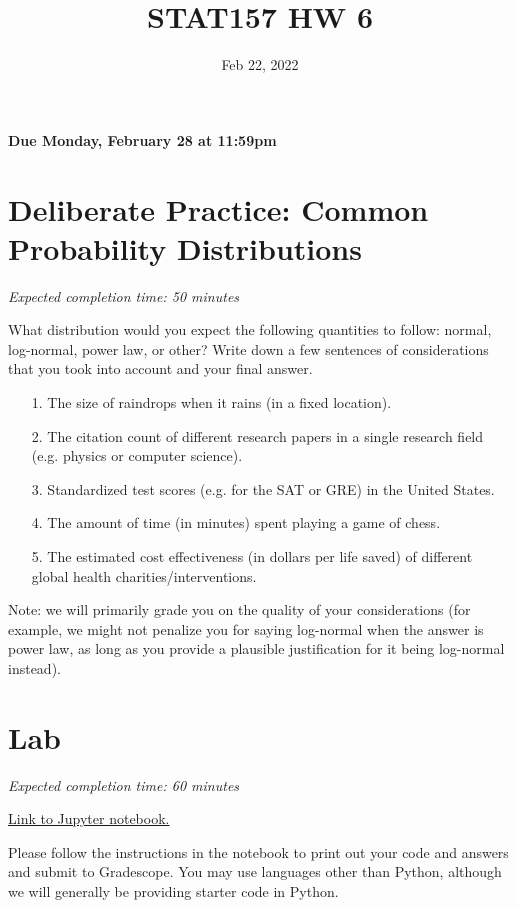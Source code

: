 \documentclass[11pt]{article}
\title{STAT157 HW 6}
\date{Feb 22, 2022}
\begin{document}
\maketitle

\hfill \textbf{Due Monday, February 28 at 11:59pm}

\section*{Deliberate Practice: Common Probability Distributions}

\emph{Expected completion time: 50 minutes}

What distribution would you expect the following quantities to follow: normal, log-normal, power law, or other? Write down a few sentences of considerations that you took into account and your final answer. 

\begin{enumerate}
	\item[1.] The size of raindrops when it rains (in a fixed location).
	\item[2.] The citation count of different research papers in a single research field (e.g. physics or computer science).
	\item[3.] Standardized test scores (e.g. for the SAT or GRE) in the United States.
	\item[4.] The amount of time (in minutes) spent playing a game of chess.
	\item[5.] The estimated cost effectiveness (in dollars per life saved) of different global health charities/interventions.
\end{enumerate}

Note: we will primarily grade you on the quality of your considerations (for example, we might not penalize you for saying log-normal when the answer is power law, as long as you provide a plausible justification for it being log-normal instead).

\section*{Lab}

\emph{Expected completion time: 60 minutes}

\href{https://datahub.berkeley.edu/hub/user-redirect/git-pull?repo=https%3A%2F%2Fgithub.com%2Fjs-d%2Fstat-157-260-website&urlpath=tree%2Fstat-157-260-website%2Fhw%2Fhw6%2Fhw6lab.ipynb&branch=main}{Link to Jupyter notebook.}

Please follow the instructions in the notebook to print out your code and answers and submit to Gradescope. You may use languages other than Python, although we will generally be providing starter code in Python.
\end{document}
